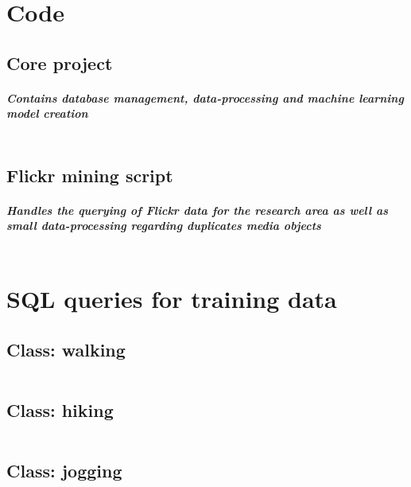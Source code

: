 \appendix

\chapter{Code} \label{python_code}

\section{Core project}
\paragraph*{Contains database management, data-processing and machine learning model creation}
\inputminted[linenos, fontsize=\tiny]{python}{code/fusion_file_appendix.py}
\clearpage

\section{Flickr mining script}
\paragraph*{Handles the querying of Flickr data for the research area as well as small data-processing regarding duplicates media objects}
\inputminted[linenos, fontsize=\tiny]{python}{code/flickr_mining_Kt_Zug_Appendix.py}
\clearpage


\chapter{SQL queries for training data} \label{sql_queries_for_trainingdata}

\section{Class: walking}

\inputminted[linenos]{sql}{code/walking.txt}
\clearpage

\section{Class: hiking}

\inputminted[linenos]{sql}{code/hiking.txt}
\clearpage

\section{Class: jogging}

